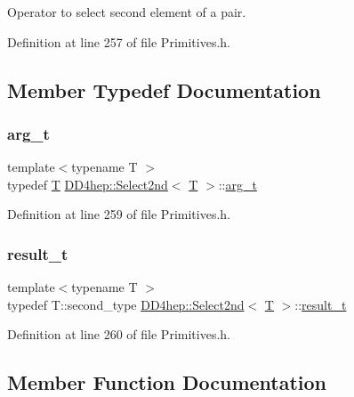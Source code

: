 Operator to select second element of a pair. 

Definition at line 257 of file Primitives.\+h.



\subsection{Member Typedef Documentation}
\hypertarget{class_d_d4hep_1_1_select2nd_a1159f763d3e02055e64e1c757c0e05c0}{}\label{class_d_d4hep_1_1_select2nd_a1159f763d3e02055e64e1c757c0e05c0} 
\subsubsection{\texorpdfstring{arg\+\_\+t}{arg\_t}}
{\footnotesize\ttfamily template$<$typename T $>$ \\
typedef \hyperlink{class_t}{T} \hyperlink{class_d_d4hep_1_1_select2nd}{D\+D4hep\+::\+Select2nd}$<$ \hyperlink{class_t}{T} $>$\+::\hyperlink{class_d_d4hep_1_1_select2nd_a1159f763d3e02055e64e1c757c0e05c0}{arg\+\_\+t}}



Definition at line 259 of file Primitives.\+h.

\hypertarget{class_d_d4hep_1_1_select2nd_acfbf4d9607a113083ddcfa3b16385c2e}{}\label{class_d_d4hep_1_1_select2nd_acfbf4d9607a113083ddcfa3b16385c2e} 
\subsubsection{\texorpdfstring{result\+\_\+t}{result\_t}}
{\footnotesize\ttfamily template$<$typename T $>$ \\
typedef T\+::second\+\_\+type \hyperlink{class_d_d4hep_1_1_select2nd}{D\+D4hep\+::\+Select2nd}$<$ \hyperlink{class_t}{T} $>$\+::\hyperlink{class_d_d4hep_1_1_select2nd_acfbf4d9607a113083ddcfa3b16385c2e}{result\+\_\+t}}



Definition at line 260 of file Primitives.\+h.



\subsection{Member Function Documentation}
\hypertarget{class_d_d4hep_1_1_select2nd_a2585cf82cc14235f21e8c493bb89185a}{}\label{class_d_d4hep_1_1_select2nd_a2585cf82cc14235f21e8c493bb89185a} 
